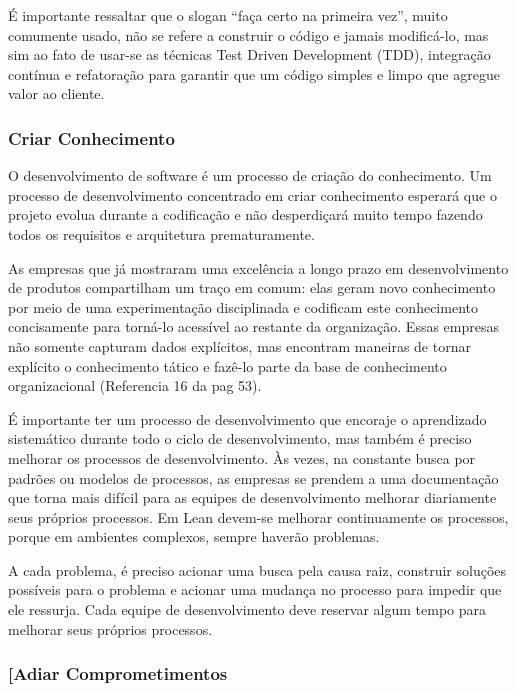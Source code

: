 É importante ressaltar que o slogan “faça certo na primeira vez”, muito comumente usado, não se refere a construir o código e jamais modificá-lo, mas sim ao fato de usar-se as técnicas Test Driven Development (TDD), integração contínua e refatoração para garantir que um código simples e limpo que agregue valor ao cliente. 

\subsubsection[Criar Conhecimento]{Criar Conhecimento}

O desenvolvimento de software é um processo de criação do conhecimento.  Um processo de desenvolvimento concentrado em criar conhecimento esperará que o projeto evolua durante a codificação e não desperdiçará muito tempo fazendo todos os requisitos e arquitetura prematuramente. 

As empresas que já mostraram uma excelência a longo prazo em desenvolvimento de produtos compartilham um traço em comum: elas geram novo conhecimento por meio de uma experimentação disciplinada e codificam este conhecimento concisamente para torná-lo acessível ao restante da organização. Essas empresas não somente capturam dados explícitos, mas encontram maneiras de tornar explícito o conhecimento tático e fazê-lo parte da base de conhecimento organizacional (Referencia 16 da pag 53).

É importante ter um processo de desenvolvimento que encoraje o aprendizado sistemático durante todo o ciclo de desenvolvimento, mas também é preciso melhorar os processos de desenvolvimento. Às vezes, na constante busca por padrões ou modelos de processos, as empresas se prendem a uma documentação que torna mais difícil para as equipes de desenvolvimento melhorar diariamente seus próprios processos. Em Lean devem-se melhorar continuamente os processos, porque em ambientes complexos, sempre haverão problemas. 

A cada problema, é preciso acionar uma busca pela causa raiz, construir soluções possíveis para o problema e acionar uma mudança no processo para impedir que ele ressurja. Cada equipe de desenvolvimento deve reservar algum tempo para melhorar seus próprios processos.

\subsubsection[Adiar Comprometimentos]{[Adiar Comprometimentos}

